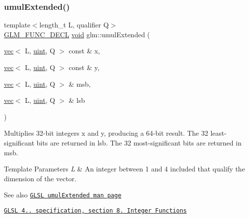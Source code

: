 \subsubsection{\texorpdfstring{umul\+Extended()}{umulExtended()}}
{\footnotesize\ttfamily template$<$length\+\_\+t L, qualifier Q$>$ \\
\mbox{\hyperlink{setup_8hpp_ab2d052de21a70539923e9bcbf6e83a51}{G\+L\+M\+\_\+\+F\+U\+N\+C\+\_\+\+D\+E\+CL}} \mbox{\hyperlink{_s_d_l__opengles2__gl2ext_8h_ae5d8fa23ad07c48bb609509eae494c95}{void}} glm\+::umul\+Extended (\begin{DoxyParamCaption}\item[{\mbox{\hyperlink{structglm_1_1vec}{vec}}$<$ L, \mbox{\hyperlink{group__core__precision_ga4fd29415871152bfb5abd588334147c8}{uint}}, Q $>$ const \&}]{x,  }\item[{\mbox{\hyperlink{structglm_1_1vec}{vec}}$<$ L, \mbox{\hyperlink{group__core__precision_ga4fd29415871152bfb5abd588334147c8}{uint}}, Q $>$ const \&}]{y,  }\item[{\mbox{\hyperlink{structglm_1_1vec}{vec}}$<$ L, \mbox{\hyperlink{group__core__precision_ga4fd29415871152bfb5abd588334147c8}{uint}}, Q $>$ \&}]{msb,  }\item[{\mbox{\hyperlink{structglm_1_1vec}{vec}}$<$ L, \mbox{\hyperlink{group__core__precision_ga4fd29415871152bfb5abd588334147c8}{uint}}, Q $>$ \&}]{lsb }\end{DoxyParamCaption})}

Multiplies 32-\/bit integers x and y, producing a 64-\/bit result. The 32 least-\/significant bits are returned in lsb. The 32 most-\/significant bits are returned in msb.


\begin{DoxyTemplParams}{Template Parameters}
{\em L} & An integer between 1 and 4 included that qualify the dimension of the vector.\\
\hline
\end{DoxyTemplParams}
\begin{DoxySeeAlso}{See also}
\href{http://www.opengl.org/sdk/docs/manglsl/xhtml/umulExtended.xml}{\tt G\+L\+SL umul\+Extended man page} 

\href{http://www.opengl.org/registry/doc/GLSLangSpec.4.20.8.pdf}{\tt G\+L\+SL 4.. specification, section 8. Integer Functions} 
\end{DoxySeeAlso}
\mbox{\label{group__core__func__integer_gae3316ba1229ad9b9f09480833321b053}} 
